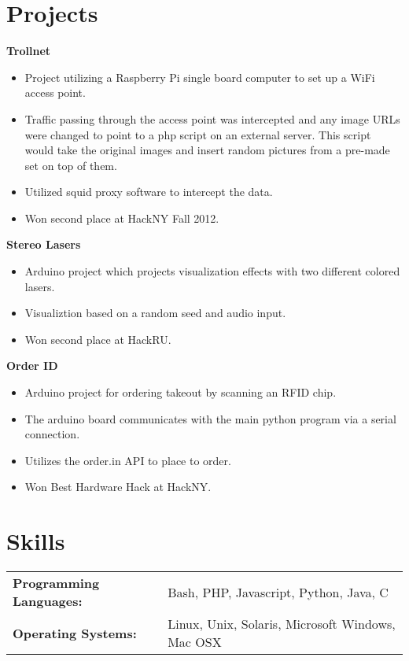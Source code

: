 \documentclass[margin]{res}
\begin{document}
\begin{resume}

\section{Projects}

	{\bf Trollnet}
	\begin{itemize} \itemsep -2pt
		\item Project utilizing a Raspberry Pi single board computer to set up a WiFi access point.
		\item Traffic passing through the access point was intercepted and any image URLs were changed to point to a php script on an external server. This script would take the original images and insert random pictures from a pre-made set on top of them.
		\item Utilized squid proxy software to intercept the data.
		\item Won second place at HackNY Fall 2012.
	\end{itemize}

	{\bf Stereo Lasers}
	\begin{itemize} \itemsep -2pt
		\item Arduino project which projects visualization effects with two different colored lasers.
		\item Visualiztion based on a random seed and audio input.
		\item Won second place at HackRU.
	\end{itemize}

	{\bf Order ID}
	\begin{itemize} \itemsep -2pt
		\item Arduino project for ordering takeout by scanning an RFID chip.
		\item The arduino board communicates with the main python program via a serial connection.
		\item Utilizes the order.in API to place to order.
		\item Won Best Hardware Hack at HackNY.
	\end{itemize}

\section{Skills}
	\begin{tabular}{l l}
		\textbf{Programming Languages:} & Bash, PHP, Javascript, Python, Java, C \\
		\textbf{Operating Systems:} & Linux, Unix, Solaris, Microsoft Windows, Mac OSX \\
	\end{tabular}

\end{resume}
\end{document}

